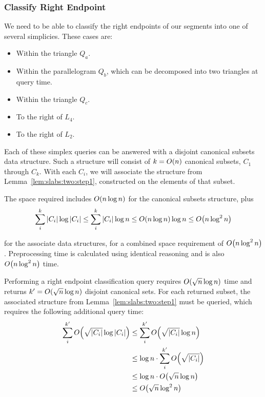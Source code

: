 \subsubsection{Classify Right Endpoint}

We need to be able to classify the right endpoints of our segments into one of several simplicies. These cases are:
\begin{itemize}
 \item Within the triangle $Q_a$.
 \item Within the parallelogram $Q_b$, which can be decomposed into two triangles at query time.
 \item Within the triangle $Q_c$.
 \item To the right of $L_4$.
 \item To the right of $L_2$.
\end{itemize}

Each of these simplex queries can be answered with a disjoint canonical subsets data structure. Such a structure will consist of $k = O\!\left(n\right)$ canonical subsets, $C_1$ through $C_k$. With each $C_i$, we will associate the structure from Lemma~\ref{lem:slabs:two:step1}, constructed on the elements of that subset.

The space required includes $O\!\left(n \log{n}\right)$ for the canonical subsets structure, plus
\[
\sum_{i}^{k}{|C_i| \log{|C_i|}} 
\leq \sum_{i}^{k}{|C_i| \log{n}} 
\leq O\!\left(n\log{n}\right) \log{n} 
\leq O\!\left(n \log^2{n}\right)
\]

\noindent for the associate data structures, for a combined space requirement of $O\!\left(n\log^2{n}\right)$. Preprocessing time is calculated using identical reasoning and is also $O\!\left(n \log^2{n}\right)$ time.

Performing a right endpoint classification query requires $O\!\left(\sqrt{n}\log{n}\right)$ time and returns $k' = O\!\left(\sqrt{n}\log{n}\right)$ disjoint canonical sets. For each returned subset, the associated structure from Lemma~\ref{lem:slabs:two:step1} must be queried, which requires the following additional query time:
\[
\begin{split}
\sum_{i}^{k'}{\BigOh{\sqrt{|C_i|}\log{|C_i|}}} 
&\leq \sum_{i}^{k'}{\BigOh{\sqrt{|C_i|} \log{n}}} \\
%
&\leq \log{n} \cdot \sum_{i}^{k'}{\BigOh{\sqrt{|C_i|}}} \\
%
&\leq \log{n} \cdot \BigOh{\sqrt{n}\log{n}} \\
%
&\leq \BigOh{\sqrt{n}\log^2{n}} \\
%
\end{split}
\]

